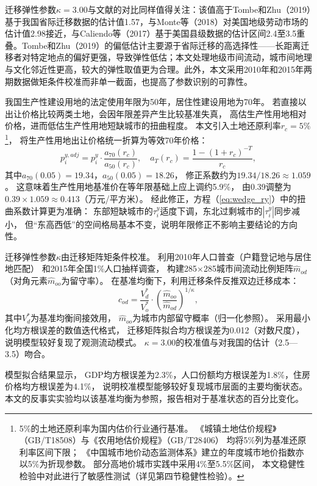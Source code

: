 \documentclass[UTF8,a4paper,12pt]{ctexart}
\theoremstyle{plain}
\theoremstyle{definition}
\theoremstyle{remark}
\newcommand{\tauy}{\tau^{y}}
\begin{document}
迁移弹性参数$\kappa=3.00$与文献的对比同样值得关注：该值高于Tombe和Zhu（2019）基于我国省际迁移数据的估计值1.57，与Monte等（2018）对美国地级劳动市场的估计值2.98接近，与Caliendo等（2017）基于美国县级数据的估计区间2.4至3.5重叠。Tombe和Zhu（2019）的偏低估计主要源于省际迁移的高选择性——长距离迁移者对特定地点的偏好更强，导致弹性低估；本文处理地级市间流动，城市间地理与文化邻近性更高，较大的弹性取值更为合理。此外，本文采用2010年和2015年两期数据做矩条件校准而非单一截面，也提高了参数识别的可靠性。

我国生产性建设用地的法定使用年限为50年，居住性建设用地为70年。
若直接以出让价格比较两类土地，会因年限差异产生比较基准失真，
高估生产性用地相对价格，进而低估生产性用地短缺城市的扭曲程度。
本文引入土地还原利率$r_c=5\%$\footnote{%
  5\%的土地还原利率为国内估价行业通行基准。
  《城镇土地估价规程》（GB/T18508）与《农用地估价规程》（GB/T28406）
  均将5\%列为基准还原利率区间下限；
  《中国城市地价动态监测体系》建立的年度城市地价指数亦以5\%为折现参数。
  部分高地价城市实践中采用4\%至5.5\%区间，
  本文稳健性检验中对此进行了敏感性测试（详见第四节稳健性检验）。}，
将生产性用地出让价格统一折算为等效70年价格：
\begin{equation}
  p_i^{y,adj}=p_i^y\cdot\frac{a_{70}(r_c)}{a_{50}(r_c)},
  \quad a_T(r_c)=\frac{1-(1+r_c)^{-T}}{r_c},
  \label{eq:land_adj}
\end{equation}
其中$a_{70}(0.05)=19.34$，$a_{50}(0.05)=18.26$，
修正系数约为$19.34/18.26\approx 1.059$。
这意味着生产性用地基准价在等年限基础上应上调约5.9\%，
由0.39调整为$0.39\times1.059\approx0.413$（万元/平方米）。
经此修正，方程（\ref{eq:wedge_ry}）中的扭曲系数计算更为准确：
东部短缺城市的$\tauy_i$适度下调，东北过剩城市的$|\tauy_i|$同步减小，
但``东高西低''的空间格局基本不变，说明年限修正不影响主要结论的方向性。

迁移弹性参数$\kappa$由迁移矩阵矩条件校准。
利用2010年人口普查（户籍登记地与居住地匹配）
和2015年全国1\%人口抽样调查，
构建285×285城市间流动比例矩阵$\hat{m}_{od}$（对角元素$\hat{m}_{oo}$为留守率）。
在基准均衡下，利用迁移条件反推双边迁移成本：
\begin{equation}
  c_{od}=\frac{V_d^*}{V_o^*}\cdot\left(\frac{\hat{m}_{oo}}{\hat{m}_{od}}\right)^{1/\kappa},
  \label{eq:mig_cost}
\end{equation}
其中$V_d^*$为基准均衡间接效用，
$\hat{m}_{oo}$为城市内部留守概率（归一化参照）。
采用最小化均方根误差的数值迭代格式，
迁移矩阵拟合均方根误差为0.012（对数尺度），
说明模型较好复现了观测流动模式。
$\kappa=3.00$的校准值与\citet{redding2017}对我国的估计（2.5—3.5）吻合。

模型拟合结果显示，
GDP均方根误差为2.3\%，人口份额均方根误差为1.8\%，住房价格均方根误差为4.1\%，
说明校准模型能够较好复现城市层面的主要均衡状态。
本文的反事实实验均以该基准均衡为参照，报告相对于基准状态的百分比变化。
\end{document}
